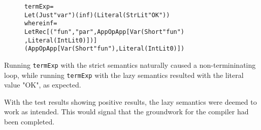 \begin{figure}[H]
\begin{alltt}
  termExp =
    Let (Just "var") (inf) (Literal (StrLit "OK"))
    where inf =
      LetRec [("fun", "par", App OpApp [Var (Short "fun")
                                       ,Literal (IntLit 0)])]
      (App OpApp [Var (Short "fun"), Literal (IntLit 0)])
\end{alltt}
\end{figure}

\noindent Running \texttt{termExp} with the strict semantics naturally caused a
non-termininating loop, while running \texttt{termExp} with the lazy semantics
resulted with the literal value "OK", as expected.

With the test results showing positive results, the lazy semantics were deemed
to work as intended. This would signal that the groundwork for the compiler
had been completed.
